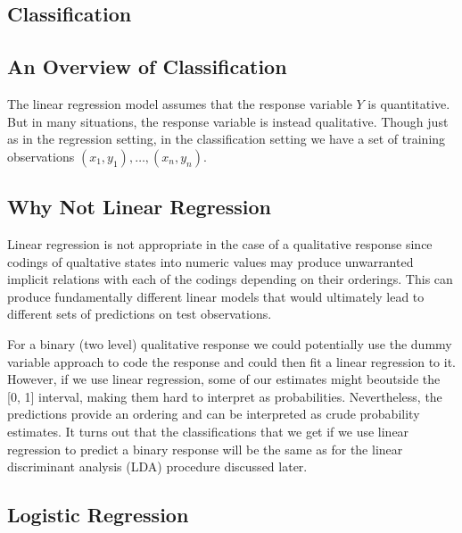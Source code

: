 \documentclass{article}
\numberwithin{equation}{section}
\begin{document}
\begin{enumerate}
\newpage
\section{Classification}

\subsection{An Overview of Classification}
The linear regression model assumes that the response variable $Y$ is quantitative. But in many situations, the response variable is instead qualitative. Though just as in the regression setting, in the classification setting we have a set of training observations $(x_1, y_1),\dots,(x_n, y_n)$.

\subsection{Why Not Linear Regression}
Linear regression is not appropriate in the case of a qualitative response since codings of qualtative states into numeric values may produce unwarranted implicit relations with each of the codings depending on their orderings. This can produce fundamentally different linear models that would ultimately lead to different sets of predictions on test observations.

For a binary (two level) qualitative response we could potentially use the dummy variable approach to code the response and could then fit a linear regression to it. However, if we use linear regression, some of our estimates might beoutside the [0, 1] interval, making them hard to interpret as probabilities. Nevertheless, the predictions provide an ordering and can be interpreted as crude probability estimates. It turns out that the classifications that we get if we use linear regression to predict a binary response will be the same as for the linear discriminant analysis (LDA) procedure discussed later.

\subsection{Logistic Regression}

\end{enumerate}
\end{document}
